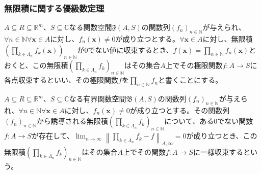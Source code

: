 \documentclass[dvipdfmx]{jsarticle}
\begin{document}
\subsubsection{無限積に関する優級数定理}%
\begin{dfn}
$A \subseteq R \subseteq \mathbb{R}^{m}$、$S \subseteq \mathbb{C}$なる関数空間$\mathfrak{F}(A,S)$の関数列$\left( f_{n} \right)_{n \in \mathbb{N}}$が与えられ、$\forall n \in \mathbb{N}\forall\mathbf{x} \in A$に対し、$f_{n}\left( \mathbf{x} \right) \neq 0$が成り立つとする。$\forall\mathbf{x} \in A$に対し、無限積$\left( \prod_{k \in \varLambda_{n}} {f_{k}\left( \mathbf{x} \right)} \right)_{n \in \mathbb{N}}$が$0$でない値に収束するとき、$f\left( \mathbf{x} \right) = \prod_{n \in \mathbb{N}} {f_{n}\left( \mathbf{x} \right)}$とおくと、この無限積$\left( \prod_{k \in \varLambda_{n}} f_{k} \right)_{n \in \mathbb{N}}$はその集合$A$上でその極限関数$f:A \rightarrow S$に各点収束するといい、その極限関数$f$を$\prod_{n \in \mathbb{N}} f_{n}$と書くことにする。
\end{dfn}
\begin{dfn}
$A \subseteq R \subseteq \mathbb{R}^{m}$、$S \subseteq \mathbb{C}$なる有界関数空間$\mathfrak{B}(A,S)$の関数列$\left( f_{n} \right)_{n \in \mathbb{N}}$が与えられ、$\forall n \in \mathbb{N}\forall\mathbf{x} \in A$に対し、$f_{n}\left( \mathbf{x} \right) \neq 0$が成り立つとする。その関数列$\left( f_{n} \right)_{n \in \mathbb{N}}$から誘導される無限積$\left( \prod_{k \in \varLambda_{n}} f_{k} \right)_{n \in \mathbb{N}}$について、ある$0$でない関数$f:A \rightarrow S$が存在して、$\lim_{n \rightarrow \infty}\left\| \prod_{k \in \varLambda_{n}} f_{k} - f \right\|_{A,\infty} = 0$が成り立つとき、この無限積$\left( \prod_{k \in \varLambda_{n}} f_{k} \right)_{n \in \mathbb{N}}$はその集合$A$上でその関数$f:A \rightarrow S$に一様収束するという。
\end{dfn}
\end{document}
